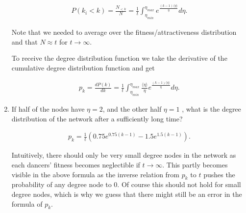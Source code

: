 \begin{enumerate}
	\begin{equation*}
		\begin{split}
			P(k_i < k) = \frac{N_{<k}}{N} = \frac{1}{t} \int_{\eta_{min}}^{\eta_{max}} e^{\frac{(k - 1) \langle \eta \rangle}{\eta}} d\eta.
		\end{split}
	\end{equation*}
	
	Note that we needed to average over the fitness/attractiveness distribution and that $N \approx t$ for $t \rightarrow \infty$. 
	
	To receive the degree distribution function we take the derivative of the cumulative degree distribution function and get
	
	\begin{equation*}
		\begin{split}
			p_k = \frac{dP(k)}{dk} = \frac{1}{t} \int_{\eta_{min}}^{\eta_{max}} \frac{\langle \eta \rangle}{\eta} e^{\frac{(k - 1) \langle \eta \rangle}{\eta}} d\eta.
		\end{split}
	\end{equation*}
	
	\item If half of the nodes have $\eta=2$, and the other half $\eta=1$ , what is the degree distribution of the network after a sufficiently long time?
	
	\begin{equation*}
		\begin{split}
			p_k = \frac{1}{t} (0.75e^{0.75(k - 1)} - 1.5e^{1.5(k - 1)}).
		\end{split}
	\end{equation*}

	Intuitively, there should only be very small degree nodes in the network as each dancers' fitness becomes neglectible if $t \rightarrow \infty$. This partly becomes visible in the above formula as the inverse relation from $p_k$ to $t$ pushes the probability of any degree node to 0. Of course this should not hold for small degree nodes, which is why we guess that there might still be an error in the formula of $p_k$. 
	
\end{enumerate}